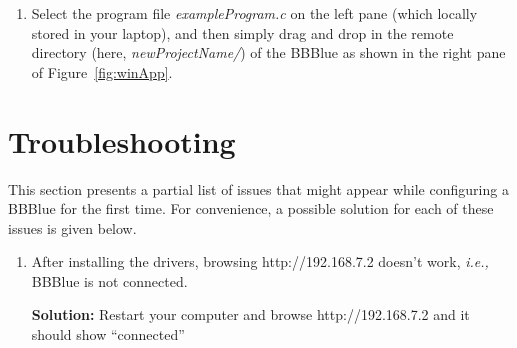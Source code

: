 \begin{enumerate}
    \item Select the program file \emph{exampleProgram.c} on the left pane (which locally stored in your laptop), and then simply drag and drop in the remote directory (here, \emph{newProjectName/}) of the BBBlue as shown in the right pane of Figure~\ref{fig:winApp}. %

    
\end{enumerate}


\section{Troubleshooting}
\label{sec:troubleshooting}
This section presents a partial list of issues that might appear while configuring a BBBlue for the first time. For convenience, a possible solution for each of these issues is given below.  
\begin{enumerate}[\emph{T\#}1:]
  

  
  
    
\item After installing the drivers, browsing http://192.168.7.2 doesn't work, \textit{i.e.,} BBBlue is not connected. \label{trst:problem2}
   
    \textbf{Solution:} Restart your computer and browse http://192.168.7.2 and it should show ``connected''


    

\end{enumerate}

